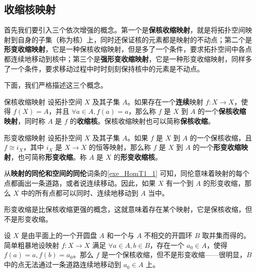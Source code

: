 

\subsection{收缩核映射}

首先我们要引入三个依次增强的概念。第一个是\textbf{保核收缩映射}，就是将拓扑空间映射到自身的子集（称为核）上，同时还保证核的元素都是映射的不动点；第二个是\textbf{形变收缩映射}，它是一种保核收缩映射，但是多了一个条件，要求拓扑空间中各点都连续地移动到核中；第三个是\textbf{强形变收缩映射}，它是一种形变收缩映射，同样多了一个条件，要求移动过程中时时刻刻保持核中的元素是不动点。

下面，我们严格描述这三个概念。

\begin{definition}{保核收缩映射}
设拓扑空间 $X$ 及其子集 $A$。如果存在一个\textbf{连续}映射 $f:X\rightarrow X$，使得 $f(X)=A$，并且 $\forall a\in A, f(a)=a$，那么称 $f$ 是 $X$ 到 $A$ 的一个\textbf{保核收缩映射}，同时称 $A$ 是 $f$ 的\textbf{收缩核}。保核收缩映射也可以简称\textbf{保核收缩}。
\end{definition}

\begin{definition}{形变收缩映射}
设拓扑空间 $X$ 及其子集 $A$。如果 $f$ 是 $X$ 到 $A$ 的一个保核收缩，且 $f\cong i_X$，其中 $i_X$ 是 $X\rightarrow X$ 的恒等映射，那么称 $f$ 是 $X$ 到 $A$ 的一个\textbf{形变收缩映射}，也可简称\textbf{形变收缩}。称 $A$ 是 $X$ 的\textbf{形变收缩核}。
\end{definition}

从\textbf{映射的同伦和空间的同伦}词条的\autoref{exe_HomT1_1} 可知，同伦意味着映射的每个点都画出一条道路，或者说连续移动。因此，如果 $X$ 有一个到 $A$ 的形变收缩，那么 $X$ 中的所有点都可以同时、连续地移动到 $A$ 当中。

形变收缩是比保核收缩更强的概念，这就意味着存在某个映射，它是保核收缩，但不是形变收缩。

\begin{example}{}
设 $X$ 是由平面上的一个开圆盘 $A$ 和一个与 $A$ 不相交的开圆环 $B$ 取并集而得的。简单粗暴地设映射 $f:X\rightarrow X$ 满足 $\forall a\in A, b\in B$，存在一个 $a_0\in A$，使得 $f(a)=a, f(b)=a_0$。那么 $f$ 是一个保核收缩，但不是形变收缩——很明显，$B$ 中的点无法通过一条道路连续地移动到 $a_0\in A$ 上。
\end{example}

